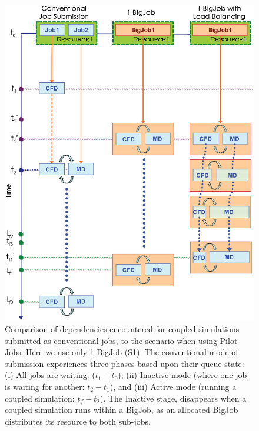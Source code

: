 \documentclass[conference,final]{IEEEtran}
\newcommand{\skonote}[1]{ {\textcolor{blue} { ***Jeff: #1 }}}
\newcommand{\skonote}[1]{}
\begin{document}
\begin{figure}
\centering
\includegraphics[scale=0.40]{Simulation_Time_of_One_BigJob.eps}
\caption{\small Comparison of dependencies encountered for coupled
  simulations submitted as conventional jobs, to the scenario when
  using Pilot-Jobs. Here we use only 1 BigJob (S1). The conventional
  mode of submission experiences three phases based upon their queue
  state: (i) All jobs are waiting: ($t_1-t_0$); (ii) Inactive mode
  (where one job is waiting for another: $t_2-t_1$), and (iii) Active
  mode (running a coupled simulation: $t_f-t_2$). The Inactive stage,
  disappears when a coupled simulation runs within a BigJob, as an
  allocated BigJob distributes its resource to both sub-jobs.}
\label{Fig:OneBJ_Flow}
\end{figure}


\end{document}
